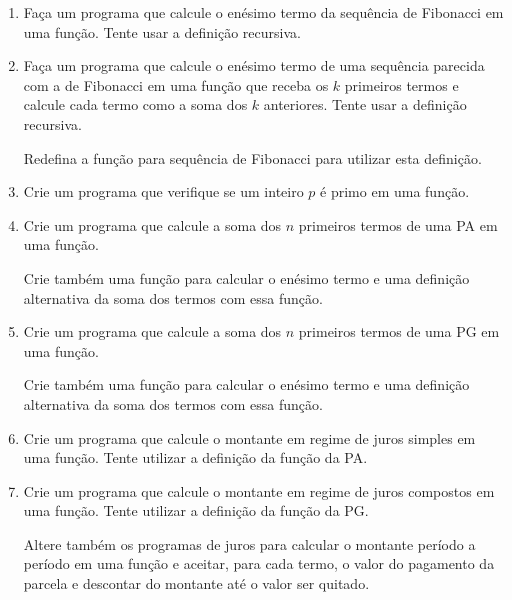 \begin{enumerate}
	Tente utilizar a definição de fatorial ou de arranjo simples neste exercício.


\quebra 


	\item Faça um programa que calcule o enésimo termo da sequência de Fibonacci em uma função.	
	Tente usar a definição recursiva.	
	

	\item Faça um programa que calcule o enésimo termo de uma sequência parecida com a de Fibonacci em uma função que receba os $k$ primeiros termos e calcule cada termo como a soma dos $k$ anteriores.
	Tente usar a definição recursiva.
	
	Redefina a função para sequência de Fibonacci para utilizar esta definição.
	

	\item Crie um programa que verifique se um inteiro $p$ é primo em uma função.	
	

	\item Crie um programa que calcule a soma dos $n$ primeiros termos de uma PA em uma função.
	
	Crie também uma função para calcular o enésimo termo e uma definição alternativa da soma dos termos com essa função.
	

	\item Crie um programa que calcule a soma dos $n$ primeiros termos de uma PG em uma função.
	
	Crie também uma função para calcular o enésimo termo e uma definição alternativa da soma dos termos com essa função.


	\item Crie um programa que calcule o montante em regime de juros simples em uma função.	
	Tente utilizar a definição da função da PA. 		


	\item Crie um programa que calcule o montante em regime de juros compostos em uma função.	
	Tente utilizar a definição da função da PG.
	
	Altere também os programas de juros para calcular o montante período a período em uma função e aceitar, para cada termo, o valor do pagamento da parcela e descontar do montante até o valor ser quitado.


\end{enumerate}
